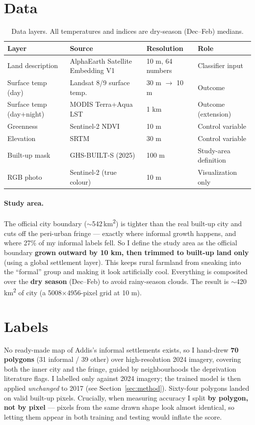 \documentclass[11pt]{article}
\begin{document}
\section{Data}
\begin{table}[htbp]
\centering
\small
\begin{tabular}{@{}llll@{}}
\toprule
Layer & Source & Resolution & Role \\
\midrule
Land description & AlphaEarth Satellite Embedding V1 & 10 m, 64 numbers & Classifier input \\
Surface temp (day) & Landsat 8/9 surface temp. & 30 m $\rightarrow$ 10 m & Outcome \\
Surface temp (day+night) & MODIS Terra+Aqua LST & 1 km & Outcome (extension) \\
Greenness & Sentinel-2 NDVI & 10 m & Control variable \\
Elevation & SRTM & 30 m & Control variable \\
Built-up mask & GHS-BUILT-S (2025) & 100 m & Study-area definition \\
RGB photo & Sentinel-2 (true colour) & 10 m & Visualization only \\
\bottomrule
\end{tabular}
\caption{Data layers. All temperatures and indices are dry-season (Dec--Feb)
medians.}
\end{table}

\paragraph{Study area.} The official city boundary ($\sim$542\,km\textsuperscript{2})
is tighter than the real built-up city and cuts off the peri-urban fringe ---
exactly where informal growth happens, and where 27\% of my informal labels
fell. So I define the study area as the official boundary \textbf{grown outward
by 10 km, then trimmed to built-up land only} (using a global settlement
layer). This keeps rural farmland from sneaking into the ``formal'' group and
making it look artificially cool. Everything is composited over the
\textbf{dry season} (Dec--Feb) to avoid rainy-season clouds. The result is
$\sim$420\,km\textsuperscript{2} of city (a 5008$\times$4956-pixel grid at
10 m).

\section{Labels}
No ready-made map of Addis's informal settlements exists, so I hand-drew
\textbf{70 polygons} (31 informal / 39 other) over high-resolution 2024
imagery, covering both the inner city and the fringe, guided by neighbourhoods
the deprivation literature flags. I labelled only against 2024 imagery; the
trained model is then applied \emph{unchanged} to 2017 (see Section~\ref{sec:method}).
Sixty-four polygons landed on valid built-up pixels. Crucially, when measuring
accuracy I split \textbf{by polygon, not by pixel} --- pixels from the same
drawn shape look almost identical, so letting them appear in both training and
testing would inflate the score.
\end{document}
